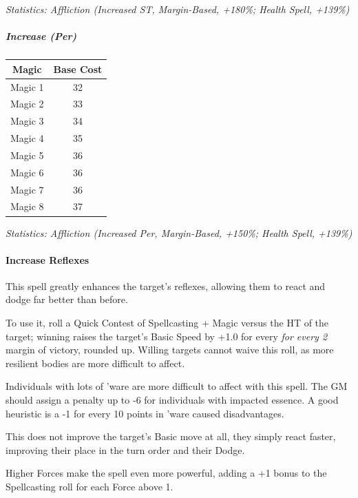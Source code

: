 \begin{multicols*}{3}
	\textcolor{OliveGreen}{\textit{Statistics: Affliction (Increased ST, Margin-Based, +180\%; Health Spell, +139\%) }}
	
	
	\subparagraph{Increase (Per)}
	
	\begin{center}
		\begin{tabular}{|c|c|}
			\hline
			Magic & Base Cost \\
			\hline
			\hline
			Magic 1 & 32 \\
			Magic 2 & 33 \\
			Magic 3 & 34 \\
			Magic 4 & 35 \\
			Magic 5 & 36 \\
			Magic 6 & 36 \\
			Magic 7 & 36 \\
			Magic 8 & 37 \\
			\hline
		\end{tabular}
	\end{center}	
	
	\textcolor{OliveGreen}{\textit{Statistics: Affliction (Increased Per, Margin-Based, +150\%; Health Spell, +139\%) }}
	
	\paragraph{Increase Reflexes}
	
	This spell greatly enhances the target's reflexes, allowing them to react and dodge far better than before.
	
	To use it, roll a Quick Contest of Spellcasting + Magic versus the HT of the target; winning raises the target's Basic Speed by +1.0 for every \textit{for every 2} margin of victory, rounded up. Willing targets cannot waive this roll, as more resilient bodies are more difficult to affect.
	
	Individuals with lots of 'ware are more difficult to affect with this spell. The GM should assign a penalty up to -6 for individuals with impacted essence. A good heuristic is a -1 for every 10 points in 'ware caused disadvantages.
	
	This does not improve the target's Basic move at all, they simply react faster, improving their place in the turn order and their Dodge.
	
	Higher Forces make the spell even more powerful, adding a +1 bonus to the Spellcasting roll for each Force above 1.	
	

\end{multicols*}
